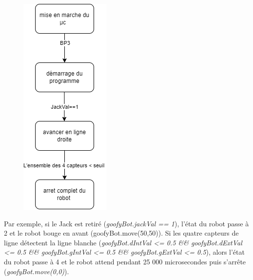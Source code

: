 \begin{figure}[H]
\centering
\begin{minipage}{.5\textwidth}
  \centering
  \centerline{\includegraphics[width=0.5\linewidth]{img/mae/confettis.png}}
  \label{fig:maeconfettis}
\end{minipage}%
\end{figure}

Par exemple, si le Jack est retiré (\emph{goofyBot.jackVal == 1}), l'état du robot passe à 2 et le robot bouge en avant (goofyBot.move(50,50)). Si les quatre capteurs de ligne détectent la ligne blanche (\emph{goofyBot.dIntVal <= 0.5 \&\& goofyBot.dExtVal <= 0.5 \&\& goofyBot.gIntVal <= 0.5 \&\& goofyBot.gExtVal <= 0.5}), alors l'état du robot passe à 4 et le robot attend pendant 25 000 microsecondes puis s'arrête (\emph{goofyBot.move(0,0)}).

